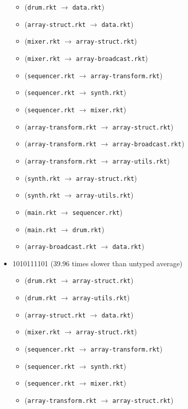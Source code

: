\documentclass{article}
\newcommand{\mono}[1]{\texttt{#1}}
\begin{document}
\begin{itemize}
\begin{itemize}
  \item (\mono{drum.rkt} $\rightarrow$ \mono{data.rkt})
  \item (\mono{array-struct.rkt} $\rightarrow$ \mono{data.rkt})
  \item (\mono{mixer.rkt} $\rightarrow$ \mono{array-struct.rkt})
  \item (\mono{mixer.rkt} $\rightarrow$ \mono{array-broadcast.rkt})
  \item (\mono{sequencer.rkt} $\rightarrow$ \mono{array-transform.rkt})
  \item (\mono{sequencer.rkt} $\rightarrow$ \mono{synth.rkt})
  \item (\mono{sequencer.rkt} $\rightarrow$ \mono{mixer.rkt})
  \item (\mono{array-transform.rkt} $\rightarrow$ \mono{array-struct.rkt})
  \item (\mono{array-transform.rkt} $\rightarrow$ \mono{array-broadcast.rkt})
  \item (\mono{array-transform.rkt} $\rightarrow$ \mono{array-utils.rkt})
  \item (\mono{synth.rkt} $\rightarrow$ \mono{array-struct.rkt})
  \item (\mono{synth.rkt} $\rightarrow$ \mono{array-utils.rkt})
  \item (\mono{main.rkt} $\rightarrow$ \mono{sequencer.rkt})
  \item (\mono{main.rkt} $\rightarrow$ \mono{drum.rkt})
  \item (\mono{array-broadcast.rkt} $\rightarrow$ \mono{data.rkt})
  \end{itemize}
\item 1010111101 (39.96 times slower than untyped average)
  \begin{itemize}
  \item (\mono{drum.rkt} $\rightarrow$ \mono{array-struct.rkt})
  \item (\mono{drum.rkt} $\rightarrow$ \mono{array-utils.rkt})
  \item (\mono{array-struct.rkt} $\rightarrow$ \mono{data.rkt})
  \item (\mono{mixer.rkt} $\rightarrow$ \mono{array-struct.rkt})
  \item (\mono{sequencer.rkt} $\rightarrow$ \mono{array-transform.rkt})
  \item (\mono{sequencer.rkt} $\rightarrow$ \mono{synth.rkt})
  \item (\mono{sequencer.rkt} $\rightarrow$ \mono{mixer.rkt})
  \item (\mono{array-transform.rkt} $\rightarrow$ \mono{array-struct.rkt})

\end{itemize}
\end{itemize}
\end{document}
